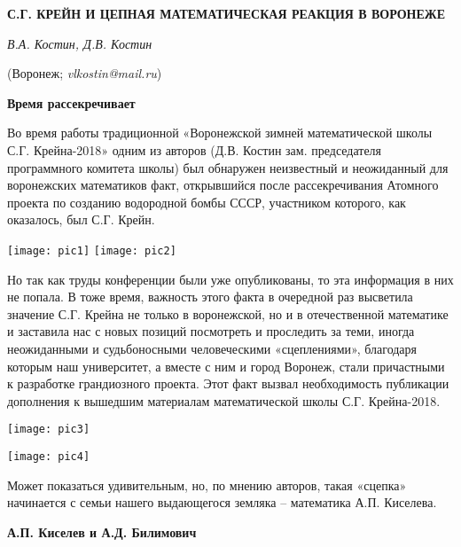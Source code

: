
\sloppy





\begin{center}
    {\bf С.Г. КРЕЙН И ЦЕПНАЯ МАТЕМАТИЧЕСКАЯ РЕАКЦИЯ В ВОРОНЕЖЕ}

    {\it В.А. Костин, Д.В. Костин}

    (Воронеж; {\it vlkostin@mail.ru})
\end{center}


\begin{center}
{\bf Время рассекречивает}
\end{center}

Во время работы традиционной «Воронежской зимней математической школы С.Г. Крейна-2018» одним из авторов (Д.В. Костин зам. председателя программного комитета школы) был обнаружен неизвестный и неожиданный для воронежских математиков факт, открывшийся после рассекречивания Атомного проекта по созданию водородной бомбы СССР, участником которого, как оказалось, был С.Г. Крейн.

\texttt{[image: pic1]}
\texttt{[image: pic2]}

Но так как труды конференции были уже опубликованы, то эта информация в них не попала. В тоже время, важность этого факта в очередной раз высветила значение С.Г. Крейна не только в воронежской, но и в отечественной математике и заставила нас с новых позиций посмотреть и проследить за теми, иногда неожиданными и судьбоносными человеческими «сцеплениями», благодаря которым наш университет, а вместе с ним и город Воронеж, стали причастными к разработке грандиозного проекта. Этот факт вызвал необходимость публикации дополнения к вышедшим материалам математической школы С.Г. Крейна-2018.

\texttt{[image: pic3]}

\texttt{[image: pic4]}

Может показаться удивительным, но, по мнению авторов, такая «сцепка» начинается с семьи нашего выдающегося земляка – математика А.П. Киселева.

\begin{center}
{\bf А.П. Киселев и А.Д. Билимович}
\end{center}

